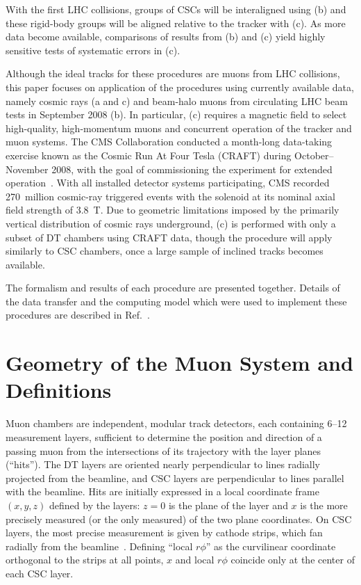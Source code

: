 With the first LHC collisions, groups of CSCs will be interaligned
using (b) and these rigid-body groups will be aligned relative to the
tracker with (c).  As more data become available, comparisons of
results from (b) and (c) yield highly sensitive tests of systematic
errors in (c).

Although the ideal tracks for these procedures are muons from LHC
collisions, this paper focuses on application of the procedures using
currently available data, namely cosmic rays (a and c) and beam-halo
muons from circulating LHC beam tests in September 2008 (b).  In
particular, (c) requires a magnetic field to select high-quality,
high-momentum muons and concurrent operation of the tracker and muon
systems.  The CMS Collaboration conducted a month-long data-taking
exercise known as the Cosmic Run At Four Tesla (CRAFT) during
October--November 2008, with the goal of commissioning the experiment
for extended operation~\cite{ref:CRAFTGeneral}.  With all installed
detector systems participating, CMS recorded 270~million cosmic-ray
triggered events with the solenoid at its nominal axial field strength
of 3.8~T.  Due to geometric limitations imposed by the primarily
vertical distribution of cosmic rays underground, (c) is performed with
only a subset of DT chambers using CRAFT data, though the procedure
will apply similarly to CSC chambers, once a large sample of
inclined tracks becomes available.

The formalism and results of each procedure are presented together.
Details of the data transfer and the computing model which were used
to implement these procedures are described in
Ref.~\cite{ref:workflow}.

\section{Geometry of the Muon System and Definitions}
\label{sec:geometry}

Muon chambers are independent, modular track detectors, each
containing 6--12 measurement layers, sufficient to determine the
position and direction of a passing muon from the intersections of its
trajectory with the layer planes (``hits'').  The DT layers are
oriented nearly perpendicular to lines radially projected from the
beamline, and CSC layers are perpendicular to lines parallel with the
beamline.  Hits are initially expressed in a local coordinate frame
$(x, y, z)$ defined by the layers: $z=0$ is the plane of the layer and
$x$ is the more precisely measured (or the only measured) of the two
plane coordinates.  On CSC layers, the most precise measurement is
given by cathode strips, which fan radially from the
beamline~\cite{ref:csc_resolution}.  Defining ``local $r\phi$'' as the
curvilinear coordinate orthogonal to the strips at all points, $x$ and
local $r\phi$ coincide only at the center of each CSC layer.

